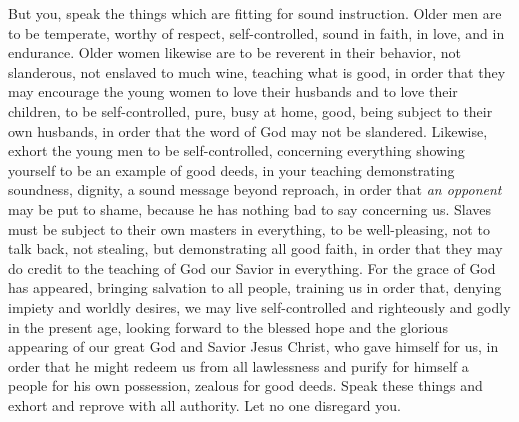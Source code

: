 \begin{biblechapter} %
 But you, speak the things which are fitting for sound instruction.
\verse Older men are to be temperate, worthy of respect, self-controlled, sound in faith, in love, and in endurance.
\verse Older women likewise are to be reverent in their behavior, not slanderous, not enslaved to much wine, teaching what is good,
\verse in order that they may encourage the young women to love their husbands and to love their children,
\verse to be self-controlled, pure, busy at home, good, being subject to their own husbands, in order that the word of God may not be slandered.
\verse Likewise, exhort the young men to be self-controlled,
\verse concerning everything showing yourself to be an example of good deeds, in your teaching demonstrating soundness, dignity,
\verse a sound message beyond reproach, in order that \textit{an opponent} may be put to shame, because he has nothing bad to say concerning us.
\verse Slaves must be subject to their own masters in everything, to be well-pleasing, not to talk back,
\verse not stealing, but demonstrating all good faith, in order that they may do credit to the teaching of God our Savior in everything.
\verse For the grace of God has appeared, bringing salvation to all people,
\verse training us in order that, denying impiety and worldly desires, we may live self-controlled and righteously and godly in the present age,
\verse looking forward to the blessed hope and the glorious appearing of our great God and Savior Jesus Christ,
\verse who gave himself for us, in order that he might redeem us from all lawlessness and purify for himself a people for his own possession, zealous for good deeds.
\verse Speak these things and exhort and reprove with all authority. Let no one disregard you.
\end{biblechapter}

